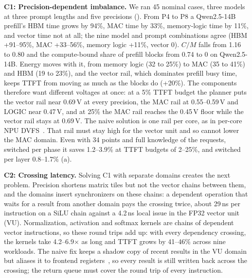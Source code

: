 \textbf{C1: Precision-dependent imbalance.}
We ran 45 nominal cases, three models at three prompt lengths and five precisions ().
From P4 to P8 a Qwen2.5-14B prefill's HBM time grows by 94\%, MAC time by 33\%, memory-logic time by 11\%, and vector time not at all; the nine model and prompt combinations agree (HBM +91--95\%, MAC +33--56\%, memory logic +11\%, vector 0).
$C/M$ falls from 1.16 to 0.80 and the compute-bound share of prefill blocks from 0.74 to 0 on Qwen2.5-14B.
Energy moves with it, from memory logic (32 to 25\%) to MAC (35 to 41\%) and HBM (19 to 23\%), and the vector rail, which dominates prefill busy time, keeps TTFT from moving as much as the blocks do (+20\%).
The components therefore want different voltages at once: at a 5\% TTFT budget the planner puts the vector rail near 0.69\,V at every precision, the MAC rail at 0.55--0.59\,V and LOGIC near 0.47\,V, and at 25\% the MAC rail reaches the 0.45\,V floor while the vector rail stays at 0.69\,V.
The naive solution is one rail per core, as in per-core NPU DVFS~\cite{ascend_dvfs:asplos25}.
That rail must stay high for the vector unit and so cannot lower the MAC domain.
Even with 34 points and full knowledge of the requests, switched per phase it saves 1.2--3.9\% at TTFT budgets of 2--25\%, and switched per layer 0.8--1.7\% (a).


\textbf{C2: Crossing latency.}
Solving C1 with separate domains creates the next problem. Precision shortens matrix tiles but not the vector chains between them, and the domains insert synchronizers on these chains: a dependent operation that waits for a result from another domain pays the crossing twice, about 29\,ns per instruction on a SiLU chain against a 4.2\,ns local issue in the FP32 vector unit (VU).
Normalization, activation and softmax kernels are chains of dependent vector instructions, so these round trips add up: with every dependency crossing, the kernels take 4.2--6.9$\times$ as long and TTFT grows by 41--46\% across nine workloads.
The naive fix keeps a shadow copy of recent results in the VU domain but aliases it to frontend registers~\cite{xue2026finedvfs}, so every result is still written back across the crossing; the return queue must cover the round trip of every instruction.

